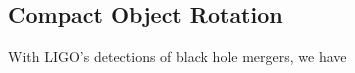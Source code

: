{\color{orange}

\subsection{Compact Object Rotation}

With LIGO's detections of black hole mergers, we have

}